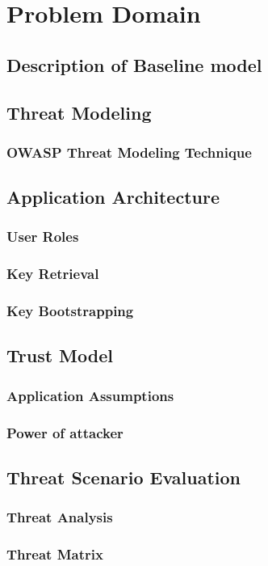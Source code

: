\chapter{Problem Domain}\label{C:tradtionalusecase}

\section{Description of Baseline model}

\section{Threat Modeling}
	\subsection{OWASP Threat Modeling Technique}

\section{Application Architecture}
	
	\subsection{User Roles}

	\subsection{Key Retrieval}

	\subsection{Key Bootstrapping}

\section{Trust Model}

	\subsection{Application Assumptions}

	\subsection{Power of attacker}

\section{Threat Scenario Evaluation}

	\subsection{Threat Analysis}

	\subsection{Threat Matrix}